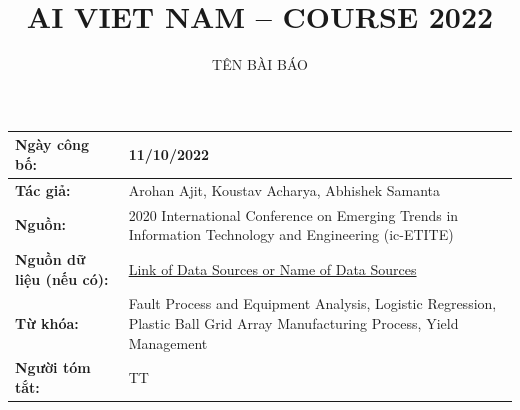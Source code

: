 \documentclass[11pt]{article}
\title{\LARGE AI VIET NAM – COURSE 2022}
\author{\Huge TÊN BÀI BÁO}
\begin{document}
\maketitle

\begin{tabular}{|p{4cm}|p{12cm}|}
 \hline
 \textbf{Ngày công bố:}
  &  11/10/2022 \\
\hline
 \textbf{Tác giả:}
  & Arohan Ajit, Koustav Acharya, Abhishek Samanta  \\
 \hline
 \textbf{Nguồn:} 
  & 2020 International Conference on Emerging Trends in Information Technology and Engineering (ic-ETITE)\\
 \hline
 \textbf{Nguồn dữ liệu (nếu có):} 
  & \href{https://colab.research.google.com/drive/14lyQVNexfDAIqCBDxYhbe0FeslDkefBB?authuser=1}{Link of Data Sources or Name of Data Sources}\\
 \hline
 \textbf{Từ khóa:} 
  & Fault Process and Equipment Analysis, Logistic Regression, Plastic Ball Grid Array Manufacturing Process, Yield Management\\
 \hline
 \textbf{Người tóm tắt:} 
  & TT\\
 \hline
\end{tabular}
\end{document}
